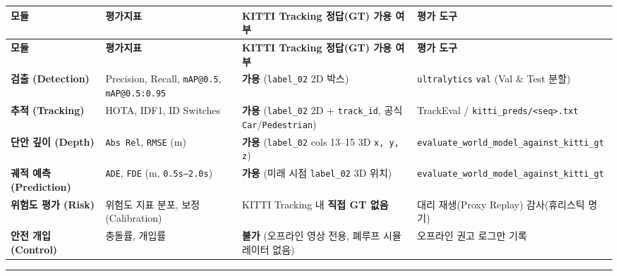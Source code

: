 \documentclass[10.5pt,a4paper]{article}
\begin{document}
\begin{footnotesize}
\setlength{\tabcolsep}{4pt}
\setlength{\LTleft}{0pt}\setlength{\LTright}{0pt}
\begin{longtable}{>{\raggedright\arraybackslash}p{} >{\raggedright\arraybackslash}p{} >{\raggedright\arraybackslash}p{} >{\raggedright\arraybackslash}p{}}
\toprule
\textbf{모듈} & \textbf{평가지표} & \textbf{KITTI Tracking 정답(GT) 가용 여부} & \textbf{평가 도구} \\
\midrule
\endfirsthead
\toprule
\textbf{모듈} & \textbf{평가지표} & \textbf{KITTI Tracking 정답(GT) 가용 여부} & \textbf{평가 도구} \\
\midrule
\endhead
\bottomrule
\endfoot
\textbf{검출 (Detection)} & Precision, Recall, \texttt{mAP@0.\allowbreak{}5}, \texttt{mAP@0.\allowbreak{}5:\allowbreak{}0.\allowbreak{}95} & \textbf{가용} (\texttt{label\_\allowbreak{}02} 2D 박스) & \texttt{ultralytics} \texttt{val} (Val \& Test 분할) \\
\textbf{추적 (Tracking)} & HOTA, IDF1, ID Switches & \textbf{가용} (\texttt{label\_\allowbreak{}02} 2D + \texttt{track\_\allowbreak{}id}, 공식 \texttt{Car}/\texttt{Pedestrian}) & TrackEval / \texttt{kitti\_\allowbreak{}preds/\allowbreak{}<seq>.\allowbreak{}txt} \\
\textbf{단안 깊이 (Depth)} & \texttt{Abs Rel}, \texttt{RMSE} (m) & \textbf{가용} (\texttt{label\_\allowbreak{}02} cols 13--15 3D \texttt{x,\allowbreak{} y,\allowbreak{} z}) & \texttt{evaluate\_\allowbreak{}world\_\allowbreak{}model\_\allowbreak{}against\_\allowbreak{}kitti\_\allowbreak{}gt} \\
\textbf{궤적 예측 (Prediction)} & \texttt{ADE}, \texttt{FDE} (m, \texttt{0.\allowbreak{}5s--2.\allowbreak{}0s}) & \textbf{가용} (미래 시점 \texttt{label\_\allowbreak{}02} 3D 위치) & \texttt{evaluate\_\allowbreak{}world\_\allowbreak{}model\_\allowbreak{}against\_\allowbreak{}kitti\_\allowbreak{}gt} \\
\textbf{위험도 평가 (Risk)} & 위험도 지표 분포, 보정(Calibration) & KITTI Tracking 내 \textbf{직접 GT 없음} & 대리 재생(Proxy Replay) 감사(휴리스틱 명기) \\
\textbf{안전 개입 (Control)} & 충돌률, 개입률 & \textbf{불가} (오프라인 영상 전용, 폐루프 시뮬레이터 없음) & 오프라인 권고 로그만 기록 \\
\end{longtable}
\end{footnotesize}


\par\noindent\rule{\textwidth}{0.4pt}\par\medskip
\end{document}
